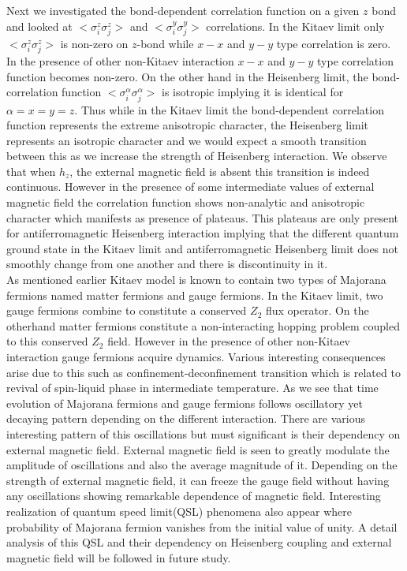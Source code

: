 \documentclass[aps,amsmath,twocolumn,amssymb,floatfix,showpacs,superscriptaddress,nofootinbib,longbibliography]{revtex4-1}
\begin{document}
Next we investigated the bond-dependent correlation function on a given $z$ bond and looked at $<\sigma^z_i \sigma^z_j>$ and $<\sigma^y_i \sigma^y_j>$ correlations. In the Kitaev limit only $<\sigma^z_i \sigma^z_j>$ is non-zero on $z$-bond while $x-x$ and $y-y$ type correlation is zero.  In the presence of other non-Kitaev interaction $x-x$ and $y-y$ type correlation function becomes non-zero.  On the other hand in the Heisenberg limit, the bond-correlation function $<\sigma^{\alpha}_i \sigma^{\alpha}_j>$ is isotropic implying it is identical for $\alpha=x=y=z$. Thus while in the Kitaev limit the bond-dependent correlation function represents the extreme anisotropic character, the Heisenberg limit represents an isotropic character and we would expect a smooth transition between this as we increase the strength of Heisenberg  interaction. We observe that when $h_z$, the external magnetic field is absent this transition is indeed continuous. However in the presence of some intermediate values of external magnetic field the correlation function shows non-analytic and anisotropic character which manifests as presence of plateaus. This plateaus are only present for antiferromagnetic Heisenberg interaction implying that the different quantum ground state in the Kitaev limit and antiferromagnetic Heisenberg limit does not smoothly change from one another and there is discontinuity in it.\\
\indent
As mentioned earlier Kitaev model is known to contain two types of Majorana fermions named matter fermions and gauge fermions. In the Kitaev limit, two gauge fermions combine to constitute a conserved $Z_2$ flux operator. On the otherhand matter fermions constitute a non-interacting hopping problem coupled to this conserved $Z_2$ field. However in the presence of other non-Kitaev interaction  gauge fermions acquire dynamics. Various interesting consequences arise due to this such as confinement-deconfinement transition which is related to revival of spin-liquid phase in intermediate temperature. As we see that time evolution of Majorana fermions and gauge fermions follows oscillatory yet decaying pattern depending on the different interaction. There are various interesting pattern of this oscillations but must significant is their dependency on external magnetic field. External magnetic field is seen to greatly modulate the amplitude of oscillations and also the average magnitude of it. Depending on the strength of external magnetic field, it can freeze the gauge field without having any oscillations showing remarkable dependence of magnetic field. Interesting realization of quantum speed limit(QSL) phenomena also appear where probability of Majorana fermion vanishes from the initial value of unity. A detail analysis of this  QSL and their dependency on Heisenberg coupling and external magnetic field will be followed in future study.\\
\end{document}
